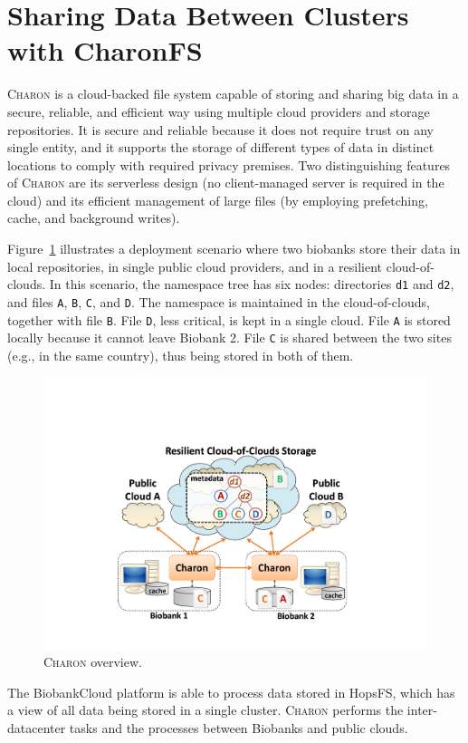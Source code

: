 \section{Sharing Data Between Clusters with CharonFS}
\textsc{Charon} is a cloud-backed file system capable of storing and sharing big data in a secure, reliable, and efficient way using multiple cloud providers and storage repositories. 
It is secure and reliable because it does not require trust on any single entity, and it supports the storage of different types of data in distinct locations to comply with required privacy premises. 
Two distinguishing features of \textsc{Charon} are its serverless design (no client-managed server is required in the cloud) and its efficient management of large files (by employing prefetching, cache, and background writes).

Figure~\ref{fig:charon} illustrates a deployment scenario where two biobanks store their data in local repositories, in single public cloud providers, and in a resilient cloud-of-clouds. 
In this scenario, the namespace tree has six nodes: directories \texttt{d1} and \texttt{d2}, and files \texttt{A}, \texttt{B}, \texttt{C}, and \texttt{D}. 
The namespace is maintained in the cloud-of-clouds, together with file \texttt{B}.
File \texttt{D}, less critical, is kept in a single cloud.
File \texttt{A} is stored locally because it cannot leave Biobank 2. 
File \texttt{C} is shared between the two sites (e.g., in the same country), thus being stored in both of them.

\vspace{-5mm}
\begin{figure}[h]
 \centering
 \includegraphics[width=0.5\columnwidth]{./imgs/charon_arch.pdf}
\caption{\small \textsc{Charon} overview.}
\label{fig:charon}
\end{figure}
\vspace{-5mm}

The BiobankCloud platform is able to process data stored in HopsFS, which has a view of all data being stored in a single cluster. \textsc{Charon} performs the inter-datacenter tasks and the processes between Biobanks and public clouds.
